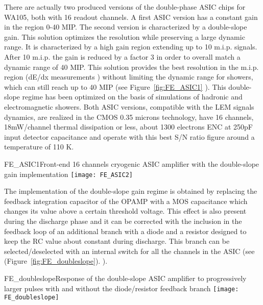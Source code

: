 There are actually two produced versions of the double-phase ASIC chips for WA105, both with 16 readout channels. A first ASIC version has a constant gain in the region 0-40 MIP. The second version is characterized by a double-slope gain. This solution optimizes the resolution while preserving a large dynamic range. It is characterized by a high gain region extending up to 10 m.i.p. signals. After 10 m.i.p. the gain is reduced by a factor 3 in order to overall match a dynamic range of 40 MIP. This solution provides the best resolution in the m.i.p. region (dE/dx measurements ) without limiting the dynamic range for showers, which can  still reach up to 40 MIP   (see  Figure~\ref{fig:FE_ASIC1} ). This double-slope regime has been optimized on the basis of simulations of hadronic and electromagnetic showers. Both ASIC versions, compatible with the LEM signals dynamics,  are realized in the CMOS 0.35 microns technology,  have 16 channels, 18mW/channel thermal dissipation or less,  about 1300 electrons ENC at 250pF input detector capacitance and operate with this best S/N ratio figure around  a temperature of 110 K.

\begin{cdrfigure}{FE_ASIC1}{Front-end 16 channels cryogenic ASIC amplifier with the double-slope gain implementation}
\texttt{[image: FE\_ASIC2]}
\end{cdrfigure}

The implementation of the double-slope gain regime is obtained by replacing the feedback integration capacitor of the OPAMP with a MOS capacitance which changes its value above a certain threshold voltage. This effect is also present during the discharge phase and it can be corrected with the inclusion in the feedback loop of an additional branch with a diode and a resistor designed to  keep the RC value about constant during discharge. This branch  can be selected/deselected with an internal switch for all the channels in the ASIC (see  (Figure~\ref{fig:FE_doubleslope}). ).

\begin{cdrfigure}{FE_doubleslope}{Response of the double-slope ASIC amplifier to progressively larger pulses with and without the diode/resistor feedback branch}
\texttt{[image: FE\_doubleslope]}
\end{cdrfigure}

